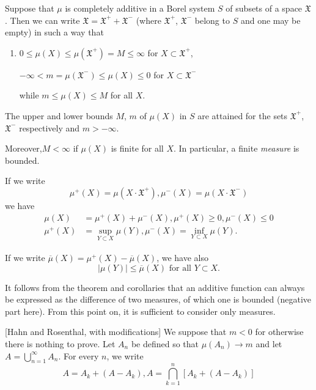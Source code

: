 \begin{theorem}\label{chap1:sec5:thm3}%
  Suppose that $\mu$
    is completely additive in a Borel system $S$ of subsets of a space
    $\mathfrak{X}$. Then we can write 
    $\mathfrak{X}= \mathfrak{X}^{+}+ \mathfrak{X}^{-}$ (where
    $\mathfrak{X}^+$, $\mathfrak{X}^-$ belong to $S$ and one may be empty)
    in such a way that 
  \begin{enumerate}
  \item  $0\leq \mu (X) \leq \mu (\mathfrak{X}^+) = M \leq \infty$ for $X
    \subset \mathfrak{X}^+$, 

    $- \infty < m = \mu (\mathfrak{X}^-) \leq \mu (X) \leq 0$ for $X \subset
    \mathfrak{X}^-$  

    while $m \leq \mu (X) \leq M$ for all $X$.
  \end{enumerate}
\end{theorem}

\begin{corollary}\label{chap1:sec5:coro1}
The upper and lower bounds $M$, $m$ of
  $\mu(X)$ in $S$ are attained for the sets $\mathfrak{X}^+$,
  $\mathfrak{X}^-$ respectively and $m > - \infty$. 

Moreover,\pageoriginale $M <\infty$ if $\mu(X)$ is finite for all $X$. In
particular, a finite {\em measure} is bounded. 
\end{corollary}

\begin{corollary}\label{chap1:sec5:coro2}
  If we write 
  $$
  \mu^{+}(X) = \mu(X\cdot\mathfrak{X}^{+}), \mu^-(X) = \mu(X\cdot
  \mathfrak{X}^-)
  $$
  we have
  \begin{align*}
    \mu(X) &= \mu^{+}(X) + \mu^-(X),  \mu^+(X) \geq 0, \mu^-(X) \leq 0 \\
    \mu^+(X) &= \sup_{Y\subset X} \mu(Y), \mu^-(X) = \inf_{Y\subset X} \mu
    (Y).
  \end{align*}
  
  If we write  $\overline{\mu}(X) = \mu^+(X) -\overline{\mu}(X)$, we
  have also
  $$
  |\mu  (Y)|\leq \overline{\mu}(X) \text{ for all } Y\subset X. 
  $$
\end{corollary}

It follows from the theorem and corollaries that an additive function
can always be expressed as the difference of two measures, of which
one is bounded 
(negative part here). From this point on, it is sufficient to consider
only measures. 

\setcounter{proofofthm}{2}
\begin{proofofthm}\label{chap1:sec5:pot3}%
  [Hahn and Rosenthal, with
    modifications] 
  We suppose that $m < 0$ for otherwise there is
  nothing to prove. Let $A_n$ be defined 
  so that $\mu (A_n) \rightarrow m$ and let $A
  =\bigcup\limits^{\infty}_{n=1} A_n$. For every $n$, we
  write 
  $$ 
  A=A_k + (A - A_k), A = \bigcap^{n}_{k=1} [A_k
    + (A - A_k)]
  $$ 
\end{proofofthm}

